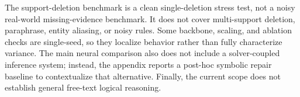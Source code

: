The support-deletion benchmark is a clean single-deletion stress test, not a
noisy real-world missing-evidence benchmark. It does not cover multi-support
deletion, paraphrase, entity aliasing, or noisy rules. Some backbone, scaling,
and ablation checks are single-seed, so they localize behavior rather than fully
characterize variance. The main neural comparison also does not include a
solver-coupled inference system; instead, the appendix reports a post-hoc
symbolic repair baseline to contextualize that alternative. Finally, the
current scope does not establish general free-text logical reasoning.
